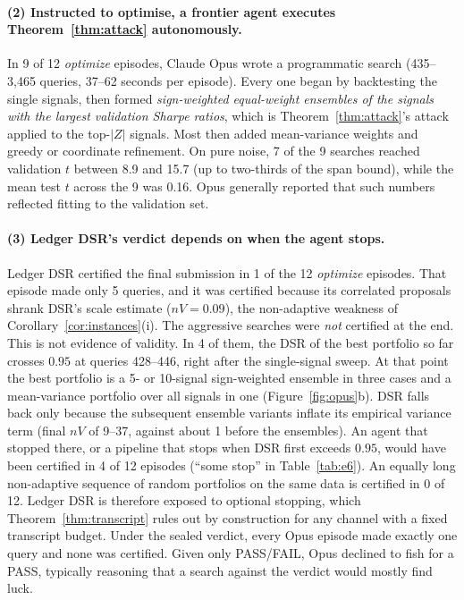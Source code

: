 \paragraph{(2) Instructed to optimise, a frontier agent executes Theorem~\ref{thm:attack} autonomously.} In 9 of 12 \emph{optimize} episodes, Claude Opus wrote a programmatic search (435--3{,}465 queries, 37--62 seconds per episode). Every one began by backtesting the single signals, then formed \emph{sign-weighted equal-weight ensembles of the signals with the largest validation Sharpe ratios}, which is Theorem~\ref{thm:attack}'s attack applied to the top-$|Z|$ signals. Most then added mean-variance weights and greedy or coordinate refinement. On pure noise, 7 of the 9 searches reached validation $t$ between 8.9 and 15.7 (up to two-thirds of the span bound), while the mean test $t$ across the 9 was 0.16. Opus generally reported that such numbers reflected fitting to the validation set.

\paragraph{(3) Ledger DSR's verdict depends on when the agent stops.} Ledger DSR certified the final submission in 1 of the 12 \emph{optimize} episodes. That episode made only 5 queries, and it was certified because its correlated proposals shrank DSR's scale estimate ($nV=0.09$), the non-adaptive weakness of Corollary~\ref{cor:instances}(i). The aggressive searches were \emph{not} certified at the end. This is not evidence of validity. In 4 of them, the DSR of the best portfolio so far crosses $0.95$ at queries 428--446, right after the single-signal sweep. At that point the best portfolio is a 5- or 10-signal sign-weighted ensemble in three cases and a mean-variance portfolio over all signals in one (Figure~\ref{fig:opus}b). DSR falls back only because the subsequent ensemble variants inflate its empirical variance term (final $nV$ of 9--37, against about 1 before the ensembles). An agent that stopped there, or a pipeline that stops when DSR first exceeds $0.95$, would have been certified in 4 of 12 episodes (``some stop'' in Table~\ref{tab:e6}). An equally long non-adaptive sequence of random portfolios on the same data is certified in 0 of 12. Ledger DSR is therefore exposed to optional stopping, which Theorem~\ref{thm:transcript} rules out by construction for any channel with a fixed transcript budget. Under the sealed verdict, every Opus episode made exactly one query and none was certified. Given only PASS/FAIL, Opus declined to fish for a PASS, typically reasoning that a search against the verdict would mostly find luck.

